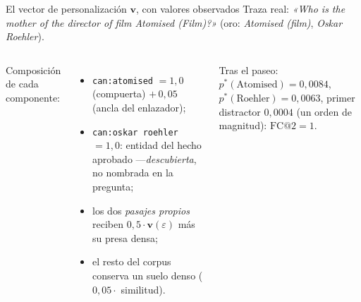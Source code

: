 \documentclass[aspectratio=169,10pt]{beamer}
\begin{document}
\begin{frame}{El vector de personalización $\mathbf v$, con valores observados}
\footnotesize Traza real: \emph{«Who is the mother of the director of film Atomised (Film)?»}
(oro: \emph{Atomised (film)}, \emph{Oskar Roehler}).
\begin{columns}[T]
\footnotesize
Composición de cada componente:
\begin{itemize}\footnotesize
\item \texttt{can:atomised} $=1{,}0$ (compuerta) $+\,0{,}05$ (ancla del enlazador);
\item \texttt{can:oskar roehler} $=1{,}0$: entidad del hecho aprobado
  ---\emph{descubierta}, no nombrada en la pregunta;
\item los dos \emph{pasajes propios} reciben $0{,}5\cdot\mathbf v(\varepsilon)$
  más su presa densa;
\item el resto del corpus conserva un suelo denso ($0{,}05\cdot$ similitud).
\end{itemize}
Tras el paseo: $p^*(\text{Atomised})=0{,}0084$,
$p^*(\text{Roehler})=0{,}0063$, primer distractor $0{,}0004$
(un orden de magnitud): $\mathrm{FC@}2=1$.
\end{columns}
\end{frame}
\end{document}

